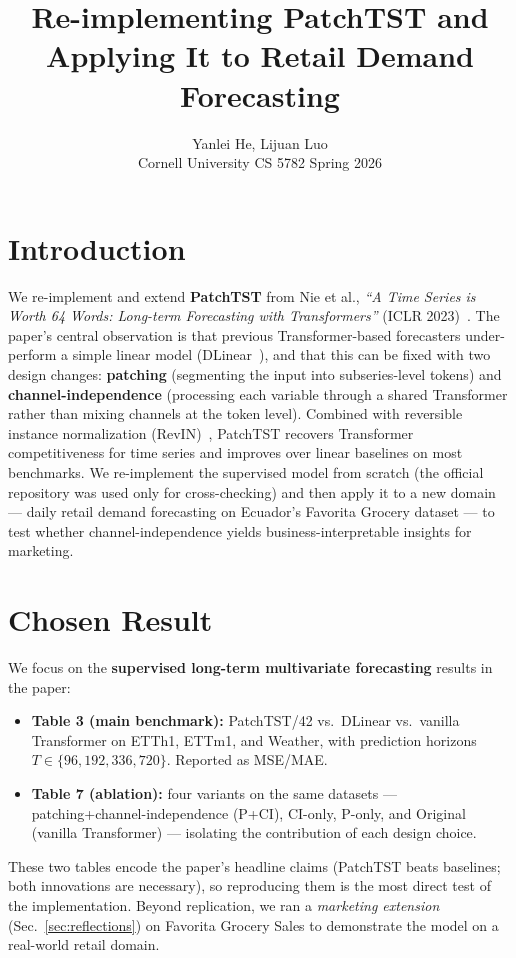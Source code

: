\documentclass[11pt]{article}
\title{\vspace{-2em}\textbf{Re-implementing PatchTST and Applying It to Retail Demand Forecasting}}
\author{Yanlei He, Lijuan Luo \\ \small Cornell University \quad CS 5782 \quad Spring 2026}
\date{\vspace{-1.5em}}
\begin{document}
\maketitle
\vspace{-1em}

\section{Introduction}

We re-implement and extend \textbf{PatchTST} from Nie et al., \emph{``A Time Series is Worth 64 Words: Long-term Forecasting with Transformers''} (ICLR 2023)~\cite{nie2023patchtst}. The paper's central observation is that previous Transformer-based forecasters under-perform a simple linear model (DLinear~\cite{zeng2023dlinear}), and that this can be fixed with two design changes: \textbf{patching} (segmenting the input into subseries-level tokens) and \textbf{channel-independence} (processing each variable through a shared Transformer rather than mixing channels at the token level). Combined with reversible instance normalization (RevIN)~\cite{kim2022revin}, PatchTST recovers Transformer competitiveness for time series and improves over linear baselines on most benchmarks. We re-implement the supervised model from scratch (the official repository was used only for cross-checking) and then apply it to a new domain --- daily retail demand forecasting on Ecuador's Favorita Grocery dataset --- to test whether channel-independence yields business-interpretable insights for marketing.

\section{Chosen Result}

We focus on the \textbf{supervised long-term multivariate forecasting} results in the paper:
\begin{itemize}
  \item \textbf{Table 3 (main benchmark):} PatchTST/42 vs.\ DLinear vs.\ vanilla Transformer on ETTh1, ETTm1, and Weather, with prediction horizons $T \in \{96, 192, 336, 720\}$. Reported as MSE/MAE.
  \item \textbf{Table 7 (ablation):} four variants on the same datasets --- patching+channel-independence (P+CI), CI-only, P-only, and Original (vanilla Transformer) --- isolating the contribution of each design choice.
\end{itemize}
These two tables encode the paper's headline claims (PatchTST beats baselines; both innovations are necessary), so reproducing them is the most direct test of the implementation. Beyond replication, we ran a \emph{marketing extension} (Sec.~\ref{sec:reflections}) on Favorita Grocery Sales to demonstrate the model on a real-world retail domain.
\end{document}
